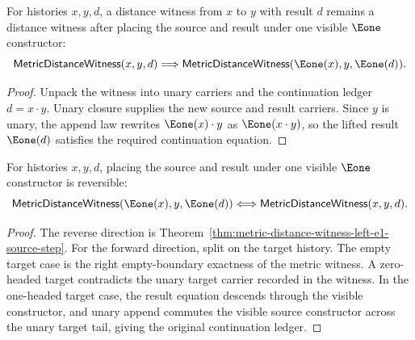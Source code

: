 \begin{theorem}
\label{thm:metric-distance-witness-left-e1-source-step}
For histories $x,y,d$, a distance witness from $x$ to $y$ with result $d$
remains a distance witness after placing the source and result under one
visible $\Eone$ constructor:
$$
\mathsf{MetricDistanceWitness}(x,y,d)
\Longrightarrow
\mathsf{MetricDistanceWitness}(\Eone(x),y,\Eone(d)).
$$
\end{theorem}
\begin{proof}
Unpack the witness into unary carriers and the continuation ledger
$d=x\cdot y$. Unary closure supplies the new source and result carriers. Since
$y$ is unary, the append law rewrites $\Eone(x)\cdot y$ as
$\Eone(x\cdot y)$, so the lifted result $\Eone(d)$ satisfies the required
continuation equation.
\end{proof}

\begin{theorem}
\label{thm:metric-distance-witness-left-e1-source-iff}
For histories $x,y,d$, placing the source and result under one visible
$\Eone$ constructor is reversible:
$$
\mathsf{MetricDistanceWitness}(\Eone(x),y,\Eone(d))
\Longleftrightarrow
\mathsf{MetricDistanceWitness}(x,y,d).
$$
\end{theorem}
\begin{proof}
The reverse direction is
Theorem~\ref{thm:metric-distance-witness-left-e1-source-step}. For the forward
direction, split on the target history. The empty target case is the right
empty-boundary exactness of the metric witness. A zero-headed target contradicts
the unary target carrier recorded in the witness. In the one-headed target case,
the result equation descends through the visible constructor, and unary append
commutes the visible source constructor across the unary target tail, giving the
original continuation ledger.
\end{proof}

